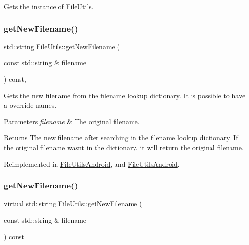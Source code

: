 Gets the instance of \hyperlink{classFileUtils}{File\+Utils}. \mbox{\label{classFileUtils_a71e6d271830df5ba7484c69928c40f5a}} 
\subsubsection{\texorpdfstring{get\+New\+Filename()}{getNewFilename()}\hspace{0.1cm}{\footnotesize\ttfamily [1/2]}}
{\footnotesize\ttfamily std\+::string File\+Utils\+::get\+New\+Filename (\begin{DoxyParamCaption}\item[{const std\+::string \&}]{filename }\end{DoxyParamCaption}) const\hspace{0.3cm}{\ttfamily [protected]}, {\ttfamily [virtual]}}

Gets the new filename from the filename lookup dictionary. It is possible to have a override names. 
\begin{DoxyParams}{Parameters}
{\em filename} & The original filename. \\
\hline
\end{DoxyParams}
\begin{DoxyReturn}{Returns}
The new filename after searching in the filename lookup dictionary. If the original filename wasn\textquotesingle{}t in the dictionary, it will return the original filename. 
\end{DoxyReturn}


Reimplemented in \hyperlink{classFileUtilsAndroid_ac084c26eecd3e89ab708ccdab36ec3de}{File\+Utils\+Android}, and \hyperlink{classFileUtilsAndroid_a57440532823c7b9f5807457fef15b978}{File\+Utils\+Android}.

\mbox{\label{classFileUtils_a5bf8b3f862e06a2f796c18dfdfe744fc}} 
\subsubsection{\texorpdfstring{get\+New\+Filename()}{getNewFilename()}\hspace{0.1cm}{\footnotesize\ttfamily [2/2]}}
{\footnotesize\ttfamily virtual std\+::string File\+Utils\+::get\+New\+Filename (\begin{DoxyParamCaption}\item[{const std\+::string \&}]{filename }\end{DoxyParamCaption}) const\hspace{0.3cm}{\ttfamily [virtual]}}

